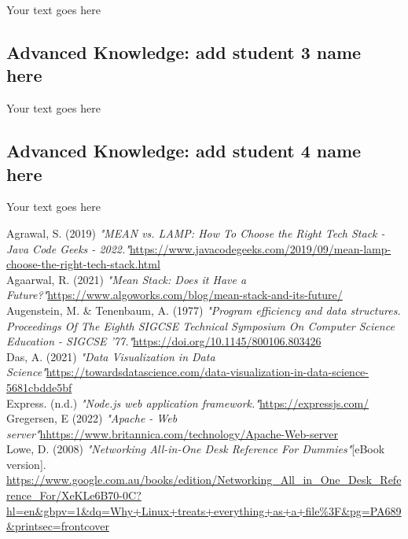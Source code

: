 \documentclass[a4paper, 11pt]{report}
\begin{document}
Your text goes here

\subsection{Advanced Knowledge: add student 3 name here}

Your text goes here

\subsection{Advanced Knowledge: add student 4 name here}

Your text goes here




\newpage





{Agrawal,  S. (2019)  \emph{"MEAN vs. LAMP: How To Choose the Right Tech Stack - Java Code Geeks - 2022."}{\url{https://www.javacodegeeks.com/2019/09/mean-lamp-choose-the-right-tech-stack.html}}}\\

{Agaarwal,  R.  (2021)  \emph{"Mean Stack: Does it Have a Future?"}{\url{https://www.algoworks.com/blog/mean-stack-and-its-future/}}}\\

{Augenstein, M.  \& Tenenbaum, A.  (1977)  \emph{"Program efficiency and data structures. Proceedings Of The Eighth SIGCSE Technical Symposium On Computer Science Education - SIGCSE '77."}{\url{https://doi.org/10.1145/800106.803426}}}\\

{Das,  A.  (2021)  \emph{"Data Visualization in Data Science"}{\url{https://towardsdatascience.com/data-visualization-in-data-science-5681cbdde5bf}}}\\

{Express.  (n.d.)  \emph{"Node.js web application framework."}{\url{https://expressjs.com/}}}\\

{Gregersen,  E (2022)  \emph{"Apache - Web server"}{\url{hhttps://www.britannica.com/technology/Apache-Web-server}}}\\

{Lowe,  D. (2008)  \emph{"Networking All-in-One Desk Reference For Dummies"}[eBook version]. {\url{https://www.google.com.au/books/edition/Networking_All_in_One_Desk_Reference_For/XeKLe6B70-0C?hl=en&gbpv=1&dq=Why+Linux+treats+everything+as+a+file\%3F&pg=PA689&printsec=frontcover}}}\\
\end{document}
